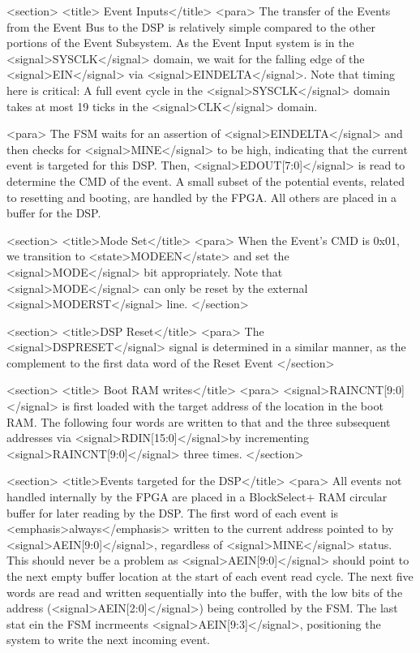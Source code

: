     <section>
      <title> Event Inputs</title>
      <para> The transfer of the Events from the Event Bus to the DSP
      is relatively simple compared to the other portions of the Event
      Subsystem. As the Event Input system is in the
      <signal>SYSCLK</signal> domain, we wait for the falling edge of
      the <signal>EIN</signal> via <signal>EINDELTA</signal>. Note
      that timing here is critical: A full event cycle in the
      <signal>SYSCLK</signal> domain takes at most 19 ticks in the
      <signal>CLK</signal> domain. 
      
      <para> The FSM waits for an assertion of
      <signal>EINDELTA</signal> and then checks for
      <signal>MINE</signal> to be high, indicating that the current
      event is targeted for this DSP. Then,
      <signal>EDOUT[7:0]</signal> is read to determine the CMD of the
      event. A small subset of the potential events, related to
      resetting and booting, are handled by the FPGA. All others are
      placed in a buffer for the DSP. 

      <section>
        <title>Mode Set</title>
        <para> When the Event's CMD is 0x01, we transition to
        <state>MODEEN</state> and set the <signal>MODE</signal> bit
        appropriately. Note that <signal>MODE</signal> can only be
        reset by the external <signal>MODERST</signal> line. 
      </section>
      
      <section>
        <title>DSP Reset</title>
        <para> The <signal>DSPRESET</signal> signal is determined in a
        similar manner, as the complement to the first data word of
        the Reset Event
      </section>
      
      <section>
        <title> Boot RAM writes</title>
        <para> <signal>RAINCNT[9:0]</signal> is first loaded with the
        target address of the location in the boot RAM. The following
        four words are written to that and the three subsequent
        addresses via <signal>RDIN[15:0]</signal>by incrementing
        <signal>RAINCNT[9:0]</signal> three times. 
      </section>

      <section>
        <title>Events targeted for the DSP</title>
        <para> All events not handled internally by the FPGA are
        placed in a BlockSelect+ RAM circular buffer for later reading
        by the DSP. The first word of each event is
        <emphasis>always</emphasis> written to the current address
        pointed to by <signal>AEIN[9:0]</signal>, regardless of
        <signal>MINE</signal> status. This should never be a problem
        as <signal>AEIN[9:0]</signal> should point to the next empty
        buffer location at the start of each event read cycle. The
        next five words are read and written sequentially into the
        buffer, with the low bits of the address
        (<signal>AEIN[2:0]</signal>) being controlled by the FSM. The
        last stat ein the FSM incrmeents <signal>AEIN[9:3]</signal>,
        positioning the system to write the next incoming
        event. 

